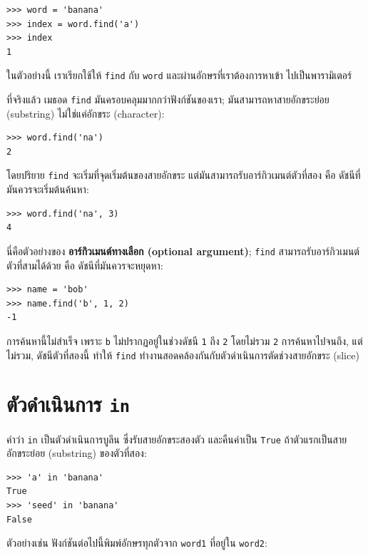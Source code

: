 \begin{verbatim}
>>> word = 'banana'
>>> index = word.find('a')
>>> index
1
\end{verbatim}
%
ในตัวอย่างนี้ เราเรียกใช้ให้ {\tt find} กับ {\tt word} และผ่านอักษรที่เราต้องการหาเข้า
ไปเป็นพารามิเตอร์

ที่จริงแล้ว เมธอด {\tt find} มันครอบคลุมมากกว่าฟังก์ชันของเรา; 
มันสามารถหาสายอักขระย่อย (substring) ไม่ใช่แค่อักขระ (character):

\begin{verbatim}
>>> word.find('na')
2
\end{verbatim}
%
โดยปริยาย {\tt find} จะเริ่มที่จุดเริ่มต้นของสายอักขระ แต่มันสามารถรับอาร์กิวเมนต์ตัวที่สอง
คือ ดัชนีที่มันควรจะเริ่มต้นค้นหา:

\begin{verbatim}
>>> word.find('na', 3)
4
\end{verbatim}
%
นี่คือตัวอย่างของ {\bf อาร์กิวเมนต์ทางเลือก (optional argument)};
{\tt find} สามารถรับอาร์กิวเมนต์ตัวที่สามได้ด้วย คือ ดัชนีที่มันควรจะหยุดหา:

\begin{verbatim}
>>> name = 'bob'
>>> name.find('b', 1, 2)
-1
\end{verbatim}
%
การค้นหานี้ไม่สำเร็จ เพราะ {\tt b} ไม่ปรากฏอยู่ในช่วงดัชนี {\tt 1} ถึง {\tt 2} โดยไม่รวม {\tt 2}
การค้นหาไปจนถึง, แต่ไม่รวม, ดัชนีตัวที่สองนี้ ทำให้ {\tt find} ทำงานสอดคล้องกันกับตัวดำเนินการตัดช่วงสายอักขระ (slice)




\section{ตัวดำเนินการ {\tt in}}
\label{inboth}

คำว่า {\tt in} เป็นตัวดำเนินการบูลีน ซึ่งรับสายอักขระสองตัว และคืนค่าเป็น {\tt True} 
ถ้าตัวแรกเป็นสายอักขระย่อย (substring) ของตัวที่สอง:

\begin{verbatim}
>>> 'a' in 'banana'
True
>>> 'seed' in 'banana'
False
\end{verbatim}
%
ตัวอย่างเช่น ฟังก์ชันต่อไปนี้พิมพ์อักษรทุกตัวจาก {\tt word1} ที่อยู่ใน {\tt word2}:

